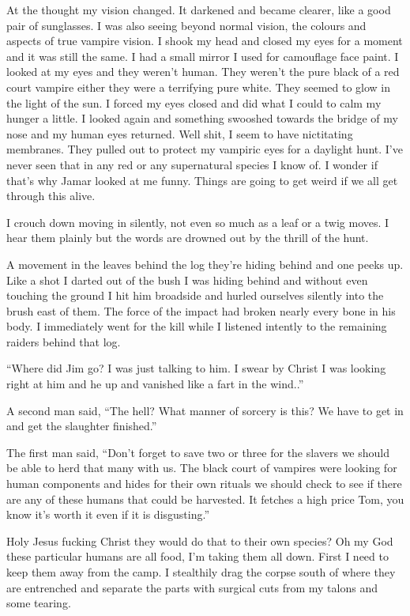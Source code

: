 At the thought my vision changed. It darkened and became clearer, like a good pair of sunglasses. I was also seeing beyond normal vision, the colours and aspects of true vampire vision. I shook my head and closed my eyes for a moment and it was still the same. I had a small mirror I used for camouflage face paint. I looked at my eyes and they weren't human. They weren't the pure black of a red court vampire either they were a terrifying pure white. They seemed to glow in the light of the sun. I forced my eyes closed and did what I could to calm my hunger a little. I looked again and something swooshed towards the bridge of my nose and my human eyes returned. Well shit, I seem to have nictitating membranes. They pulled out to protect my vampiric eyes for a daylight hunt. I've never seen that in any red or any supernatural species I know of. I wonder if that's why Jamar looked at me funny. Things are going to get weird if we all get through this alive.

I  crouch down moving in silently, not even so much as a leaf or a twig moves. I hear them plainly but the words are drowned out by the thrill of the hunt. 

A movement in the leaves behind the log they're hiding behind and one peeks up. Like a shot I darted out of the bush I was hiding behind and without even touching the ground I hit him broadside and hurled ourselves silently into the brush east of them. The force of the impact had broken nearly every bone in his body. I immediately went for the kill while I listened intently to the remaining raiders behind that log.

``Where did Jim go? I was just talking to him. I swear by Christ I was looking right at him and he up and vanished like a fart in the wind..''

A second man said, ``The hell? What manner of sorcery is this? We have to get in and get the slaughter finished.''

The first man said, ``Don't forget to save two or three for the slavers we should be able to herd that many with us. The black court of vampires were looking for human components and hides for their own rituals we should check to see if there are any of these humans that could be harvested. It fetches a high price Tom, you know it's worth it even if it is disgusting.''

Holy Jesus fucking Christ they would do that to their own species? Oh my God these particular humans are all food, I'm taking them all down. First I need to keep them away from the camp. I stealthily drag the corpse south of where they are entrenched and separate the parts with surgical cuts from my talons and some tearing.

